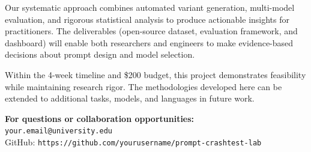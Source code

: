 \documentclass[11pt,a4paper]{article}
\begin{document}
Our systematic approach combines automated variant generation, multi-model evaluation, and rigorous statistical analysis to produce actionable insights for practitioners. The deliverables (open-source dataset, evaluation framework, and dashboard) will enable both researchers and engineers to make evidence-based decisions about prompt design and model selection.

Within the 4-week timeline and \$200 budget, this project demonstrates feasibility while maintaining research rigor. The methodologies developed here can be extended to additional tasks, models, and languages in future work.

\vspace{1cm}

\begin{center}
\textbf{For questions or collaboration opportunities:}\\
\vspace{0.3cm}
\texttt{your.email@university.edu}\\
\vspace{0.2cm}
GitHub: \texttt{https://github.com/yourusername/prompt-crashtest-lab}
\end{center}
\end{document}
